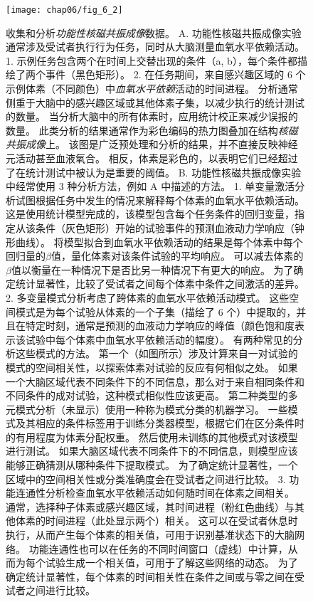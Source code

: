 \begin{figure}[htbp]
	\centering
	\texttt{[image: chap06/fig\_6\_2]}
	\caption{收集和分析\textit{功能性核磁共振成像}数据。
		A. 功能性核磁共振成像实验通常涉及受试者执行行为任务，同时从大脑测量血氧水平依赖活动。
		1. 示例任务包含两个在时间上交替出现的条件（a, b），每个条件都描绘了两个事件（黑色矩形）。
		2. 在任务期间，来自感兴趣区域的 6 个示例体素（不同颜色）中\textit{血氧水平依赖}活动的时间进程。
		分析通常侧重于大脑中的感兴趣区域或其他体素子集，以减少执行的统计测试的数量。
		当分析大脑中的所有体素时，应用统计校正来减少误报的数量。
		此类分析的结果通常作为彩色编码的热力图叠加在结构\textit{核磁共振成像}上。
		该图是广泛预处理和分析的结果，并不直接反映神经元活动甚至血液氧合。
		相反，体素是彩色的，以表明它们已经超过了在统计测试中被认为是重要的阈值。
		B. 功能性核磁共振成像实验中经常使用 3 种分析方法，例如 A 中描述的方法。
		1. 单变量激活分析试图根据任务中发生的情况来解释每个体素的血氧水平依赖活动。 
		这是使用统计模型完成的，该模型包含每个任务条件的回归变量，指定从该条件（灰色矩形）开始的试验事件的预测血液动力学响应（钟形曲线）。 
		将模型拟合到血氧水平依赖活动的结果是每个体素中每个回归量的$\beta$值，量化体素对该条件试验的平均响应。 
		可以减去体素的$\beta$值以衡量在一种情况下是否比另一种情况下有更大的响应。
		为了确定统计显著性，比较了受试者之间每个体素中条件之间激活的差异。
		2. 多变量模式分析考虑了跨体素的血氧水平依赖活动模式。
		这些空间模式是为每个试验从体素的一个子集（描绘了 6 个）中提取的，并且在特定时刻，通常是预测的血液动力学响应的峰值（颜色饱和度表示该试验中每个体素中血氧水平依赖活动的幅度）。
		有两种常见的分析这些模式的方法。
		第一个（如图所示）涉及计算来自一对试验的模式的空间相关性，以探索体素对试验的反应有何相似之处。
		如果一个大脑区域代表不同条件下的不同信息，那么对于来自相同条件和不同条件的成对试验，这种模式相似性应该更高。
		第二种类型的多元模式分析（未显示）使用一种称为模式分类的机器学习。
		一些模式及其相应的条件标签用于训练分类器模型，根据它们在区分条件时的有用程度为体素分配权重。
		然后使用未训练的其他模式对该模型进行测试。
		如果大脑区域代表不同条件下的不同信息，则模型应该能够正确猜测从哪种条件下提取模式。
		为了确定统计显著性，一个区域中的空间相关性或分类准确度会在受试者之间进行比较。
		3. 功能连通性分析检查血氧水平依赖活动如何随时间在体素之间相关。
		通常，选择种子体素或感兴趣区域，其时间进程（粉红色曲线）与其他体素的时间进程（此处显示两个）相关。
		这可以在受试者休息时执行，从而产生每个体素的相关值，可用于识别基准状态下的大脑网络。
		功能连通性也可以在任务的不同时间窗口（虚线）中计算，从而为每个试验生成一个相关值，可用于了解这些网络的动态。
		为了确定统计显著性，每个体素的时间相关性在条件之间或与零之间在受试者之间进行比较。}
	\label{fig:6_2}
\end{figure}

